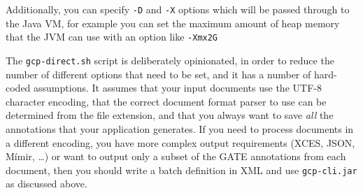 Additionally, you can specify \verb!-D! and \verb!-X! options which will be
passed through to the Java VM, for example you can set the maximum amount of
heap memory that the JVM can use with an option like \verb!-Xmx2G!

The \verb!gcp-direct.sh! script is deliberately opinionated, in order to reduce
the number of different options that need to be set, and it has a number of
hard-coded assumptions.  It assumes that your input documents use the UTF-8
character encoding, that the correct document format parser to use can be
determined from the file extension, and that you always want to save \emph{all}
the annotations that your application generates.  If you need to process
documents in a different encoding, you have more complex output requirements
(XCES, JSON, M\'{i}mir, \ldots) or want to output only a subset of the GATE
annotations from each document, then you should write a batch definition in XML
and use \verb!gcp-cli.jar! as discussed above.

